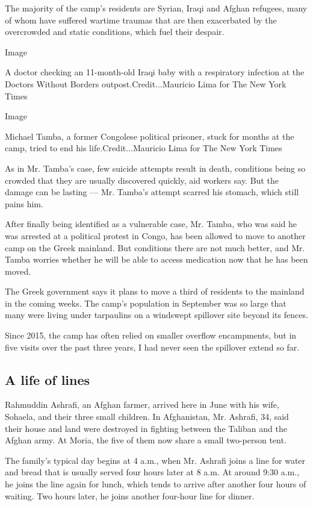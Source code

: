 The majority of the camp's residents are Syrian, Iraqi and Afghan
refugees, many of whom have suffered wartime traumas that are then
exacerbated by the overcrowded and static conditions, which fuel their
despair.

Image

A doctor checking an 11-month-old Iraqi baby with a respiratory
infection at the Doctors Without Borders outpost.Credit...Mauricio Lima
for The New York Times

Image

Michael Tamba, a former Congolese political prisoner, stuck for months
at the camp, tried to end his life.Credit...Mauricio Lima for The New
York Times

As in Mr. Tamba's case, few suicide attempts result in death, conditions
being so crowded that they are usually discovered quickly, aid workers
say. But the damage can be lasting --- Mr. Tamba's attempt scarred his
stomach, which still pains him.

After finally being identified as a vulnerable case, Mr. Tamba, who was
said he was arrested at a political protest in Congo, has been allowed
to move to another camp on the Greek mainland. But conditions there are
not much better, and Mr. Tamba worries whether he will be able to access
medication now that he has been moved.

The Greek government says it plans to move a third of residents to the
mainland in the coming weeks. The camp's population in September was so
large that many were living under tarpaulins on a windswept spillover
site beyond its fences.

Since 2015, the camp has often relied on smaller overflow encampments,
but in five visits over the past three years, I had never seen the
spillover extend so far.

\hypertarget{a-life-of-lines}{%
\subsection{A life of lines}\label{a-life-of-lines}}

Rahmuddin Ashrafi, an Afghan farmer, arrived here in June with his wife,
Sohaela, and their three small children. In Afghanistan, Mr. Ashrafi,
34, said their house and land were destroyed in fighting between the
Taliban and the Afghan army. At Moria, the five of them now share a
small two-person tent.

The family's typical day begins at 4 a.m., when Mr. Ashrafi joins a line
for water and bread that is usually served four hours later at 8 a.m. At
around 9:30 a.m., he joins the line again for lunch, which tends to
arrive after another four hours of waiting. Two hours later, he joins
another four-hour line for dinner.

